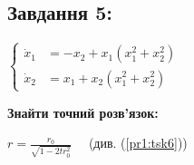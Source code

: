 \subsection{Завдання 5:}

$\left\{\begin{aligned}
    \dot{x}_1  &= -x_2 + x_1(x_1^2 + x_2^2)\\
    \dot{x}_2 &= x_1 + x_2(x_1^2 + x_2^2)
\end{aligned}\right.$

\textbf{Знайти точний розв'язок:}

$r = \frac{r_0}{\sqrt{1-2tr_0^2}}$ \  \ (див. (\ref{pr1:tsk6}))